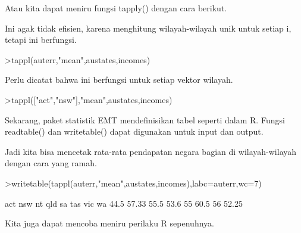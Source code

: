 \documentclass[a4paper,10pt]{article}
\begin{document}
\begin{eulernotebook}
\begin{eulercomment}
\begin{eulercomment}
\begin{eulercomment}
\begin{eulercomment}
\begin{eulercomment}
Atau kita dapat meniru fungsi tapply() dengan cara berikut.
\end{eulercomment}
\begin{eulercomment}
Ini agak tidak efisien, karena menghitung wilayah-wilayah unik untuk
setiap i, tetapi ini berfungsi.
\end{eulercomment}
\begin{eulerprompt}
>tappl(auterr,"mean",austates,incomes)
\end{eulerprompt}
\begin{euleroutput}
  [44.5,  57.3333333333,  55.5,  53.6,  55,  60.5,  56,  52.25]
\end{euleroutput}
\begin{eulercomment}
Perlu dicatat bahwa ini berfungsi untuk setiap vektor wilayah.
\end{eulercomment}
\begin{eulerprompt}
>tappl(["act","nsw"],"mean",austates,incomes)
\end{eulerprompt}
\begin{euleroutput}
  [44.5,  57.3333333333]
\end{euleroutput}
\begin{eulercomment}
Sekarang, paket statistik EMT mendefinisikan tabel seperti dalam R.
Fungsi readtable() dan writetable() dapat digunakan untuk input dan
output.

Jadi kita bisa mencetak rata-rata pendapatan negara bagian di
wilayah-wilayah dengan cara yang ramah.
\end{eulercomment}
\begin{eulerprompt}
>writetable(tappl(auterr,"mean",austates,incomes),labc=auterr,wc=7)
\end{eulerprompt}
\begin{euleroutput}
      act    nsw     nt    qld     sa    tas    vic     wa
     44.5  57.33   55.5   53.6     55   60.5     56  52.25
\end{euleroutput}
\begin{eulercomment}
Kita juga dapat mencoba meniru perilaku R sepenuhnya.


\end{eulercomment}
\end{eulercomment}
\end{eulercomment}
\end{eulercomment}
\end{eulercomment}
\end{eulernotebook}
\end{document}
